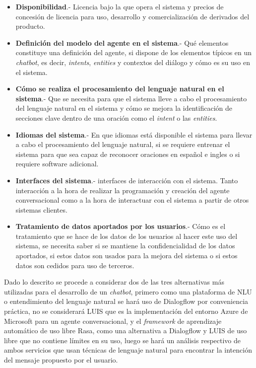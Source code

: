 \documentclass[letter, openright, 12pt]{book}
\begin{document}
\begin{itemize}
\item \textbf{Disponibilidad}.- Licencia bajo la que opera el sistema y precios de concesión de licencia para uso, desarrollo y comercialización de derivados del producto. 
\item \textbf{Definición del modelo del agente en el sistema}.- Qué elementos constituye una definición del agente, si dispone de los elementos típicos en un \textit{chatbot}, es decir, \textit{intents}, \textit{entities} y contextos del diálogo y cómo es su uso en el sistema.
\item \textbf{Cómo se realiza el procesamiento del lenguaje natural en el sistema}.- Que se necesita para que el sistema lleve a cabo el procesamiento del lenguaje natural en el sistema y cómo se mejora la identificación de secciones clave dentro de una oración como el \textit{intent} o las \textit{entities}. 
\item \textbf{Idiomas del sistema}.- En que idiomas está disponible el sistema para llevar a cabo el procesamiento del lenguaje natural, si se requiere entrenar el sistema para que sea capaz de reconocer oraciones en español e ingles o si requiere software adicional.
\item \textbf{Interfaces del sistema}.- interfaces de interacción con el sistema. Tanto interacción a la hora de realizar la programación y creación del agente conversacional como a la hora de interactuar con el sistema a partir de otros sistemas clientes.
\item \textbf{Tratamiento de datos aportados por los usuarios}.- Cómo es el tratamiento que se hace de los datos de los usuarios al hacer este uso del sistema, se necesita saber si se mantiene la confidencialidad de los datos aportados, si estos datos son usados para la mejora del sistema o si estos datos son cedidos para uso de terceros.

\end{itemize}


Dado lo descrito se procede a considerar dos de las tres alternativas más utilizadas para el desarrollo de un \textit{chatbot}, primero como una plataforma de NLU o entendimiento del lenguaje natural se hará uso de Dialogflow por conveniencia práctica, no se considerará LUIS que es la implementación del entorno Azure de Microsoft para un agente conversacional, y el \textit{framework} de aprendizaje automático de uso libre Rasa, como una alternativa a Dialogflow y LUIS de uso libre que no contiene límites en su uso, luego se hará un análisis respectivo de ambos servicios que usan técnicas de lenguaje natural para encontrar la intención del mensaje propuesto por el usuario. 
\end{document}
